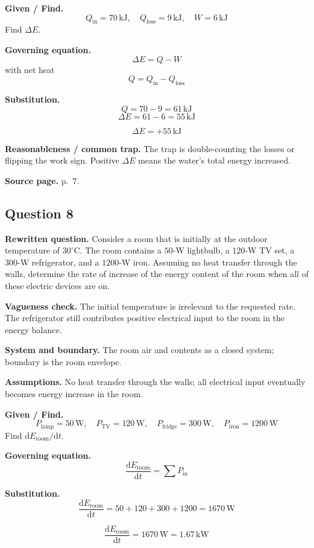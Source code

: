 \textbf{Given / Find.}
\[
Q_{\text{in}}=70\,\mathrm{kJ},\quad Q_{\text{loss}}=9\,\mathrm{kJ},\quad W=6\,\mathrm{kJ}
\]
Find $\Delta E$.

\textbf{Governing equation.}
\[
\Delta E=Q-W
\]
with net heat
\[
Q=Q_{\text{in}}-Q_{\text{loss}}
\]

\textbf{Substitution.}
\[
Q=70-9=61\,\mathrm{kJ}
\]
\[
\Delta E=61-6=55\,\mathrm{kJ}
\]

\[\boxed{\Delta E=+55\,\mathrm{kJ}}\]

\textbf{Reasonableness / common trap.} The trap is double-counting the losses or flipping the work sign. Positive $\Delta E$ means the water's total energy increased.

\textbf{Source page.} p.~7.

\subsection*{Question 8}
\textbf{Rewritten question.} Consider a room that is initially at the outdoor temperature of $30^\circ\mathrm{C}$. The room contains a $50$-W lightbulb, a $120$-W TV set, a $300$-W refrigerator, and a $1200$-W iron. Assuming no heat transfer through the walls, determine the rate of increase of the energy content of the room when all of these electric devices are on.

\textbf{Vagueness check.} The initial temperature is irrelevant to the requested rate. The refrigerator still contributes positive electrical input to the room in the energy balance.

\textbf{System and boundary.} The room air and contents as a closed system; boundary is the room envelope.

\textbf{Assumptions.} No heat transfer through the walls; all electrical input eventually becomes energy increase in the room.

\textbf{Given / Find.}
\[
P_{\text{lamp}}=50\,\mathrm{W},\quad P_{\text{TV}}=120\,\mathrm{W},\quad P_{\text{fridge}}=300\,\mathrm{W},\quad P_{\text{iron}}=1200\,\mathrm{W}
\]
Find $\mathrm{d}E_{\text{room}}/\mathrm{d}t$.

\textbf{Governing equation.}
\[
\frac{\mathrm{d}E_{\text{room}}}{\mathrm{d}t}=\sum P_{\text{in}}
\]

\textbf{Substitution.}
\[
\frac{\mathrm{d}E_{\text{room}}}{\mathrm{d}t}=50+120+300+1200=1670\,\mathrm{W}
\]

\[
\boxed{\frac{\mathrm{d}E_{\text{room}}}{\mathrm{d}t}=1670\,\mathrm{W}=1.67\,\mathrm{kW}}\]

